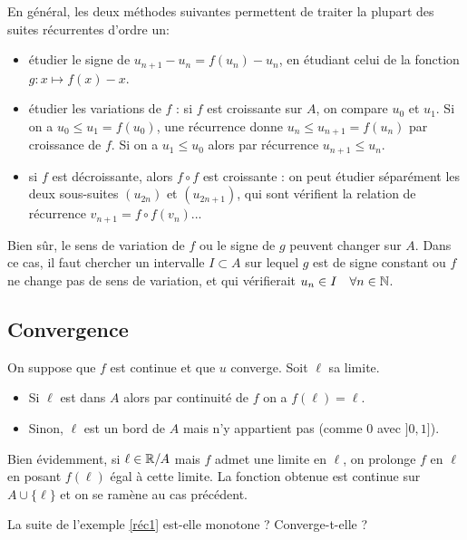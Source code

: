 \documentclass[../main.tex]{subfiles}
\begin{document}
En général, les deux méthodes suivantes permettent de traiter la plupart des suites récurrentes d'ordre un:
\begin{itemize}
    \item étudier le signe de $u_{n+1}-u_n=f(u_n)-u_n$, en étudiant celui de la fonction $g:x\mapsto f(x) - x$. 
    \item étudier les variations de $f$ : si $f$ est croissante sur $A$, on compare $u_0$ et $u_1$. Si on a $u_0\leq u_1=f(u_0)$, une récurrence donne $u_n\leq u_{n+1}=f(u_n)$ par croissance de $f$. Si on a $u_1\leq u_0$ alors par récurrence $u_{n+1}\leq u_n$.
    \item si $f$ est décroissante, alors $f\circ f$ est croissante : on peut étudier séparément les deux sous-suites $(u_{2n})$ et $(u_{2n+1})$, qui sont vérifient la relation de récurrence $v_{n+1}=f\circ f(v_n)$...
\end{itemize}
Bien sûr, le sens de variation de $f$ ou le signe de $g$ peuvent changer sur $A$. Dans ce cas, il faut chercher un intervalle $I\subset A$ sur lequel $g$ est de signe constant ou $f$ ne change pas de sens de variation, et qui vérifierait $u_n\in I\quad \forall n\in\mathbb N$.


\subsection{Convergence}

\begin{prop}
    On suppose que $f$ est continue et que $u$ converge. Soit $\ell$ sa limite. 
    \begin{itemize}
        \item Si $\ell$ est dans $A$ alors par continuité de $f$ on a $f(\ell)=\ell$.
        \item Sinon, $\ell$ est un bord de $A$ mais n'y appartient pas (comme $0$ avec $]0,1]$).
    \end{itemize}
\end{prop}

\begin{rem}
    Bien évidemment, si $\ell\in \mathbb R/A$ mais $f$ admet une limite en $\ell$, on prolonge $f$ en $\ell$ en posant $f(\ell)$ égal à cette limite. La fonction obtenue est continue sur $A\cup\{\ell\}$ et on se ramène au cas précédent.
\end{rem}

\begin{exo}[M]
	La suite de l'exemple \ref{réc1} est-elle monotone ? Converge-t-elle ?
\end{exo}
\end{document}
